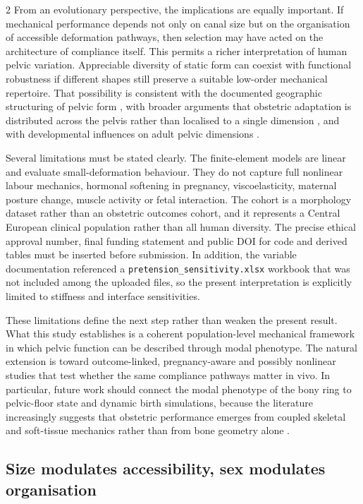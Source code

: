 \documentclass[openacc]{rsproca_new}
\begin{document}
\begin{multicols}{2}
From an evolutionary perspective, the implications are equally important. If mechanical performance depends not only on canal size but on the organisation of accessible deformation pathways, then selection may have acted on the architecture of compliance itself. This permits a richer interpretation of human pelvic variation. Appreciable diversity of static form can coexist with functional robustness if different shapes still preserve a suitable low-order mechanical repertoire. That possibility is consistent with the documented geographic structuring of pelvic form \cite{BettiManica2018,Auerbach2018}, with broader arguments that obstetric adaptation is distributed across the pelvis rather than localised to a single dimension \cite{KurkiDecrausaz2015}, and with developmental influences on adult pelvic dimensions \cite{VerbruggenNowlan2017,Novak2020}.

Several limitations must be stated clearly. The finite-element models are linear and evaluate small-deformation behaviour. They do not capture full nonlinear labour mechanics, hormonal softening in pregnancy, viscoelasticity, maternal posture change, muscle activity or fetal interaction. The cohort is a morphology dataset rather than an obstetric outcomes cohort, and it represents a Central European clinical population rather than all human diversity. The precise ethical approval number, final funding statement and public DOI for code and derived tables must be inserted before submission. In addition, the variable documentation referenced a \texttt{pretension\_sensitivity.xlsx} workbook that was not included among the uploaded files, so the present interpretation is explicitly limited to stiffness and interface sensitivities.

These limitations define the next step rather than weaken the present result. What this study establishes is a coherent population-level mechanical framework in which pelvic function can be described through modal phenotype. The natural extension is toward outcome-linked, pregnancy-aware and possibly nonlinear studies that test whether the same compliance pathways matter in vivo. In particular, future work should connect the modal phenotype of the bony ring to pelvic-floor state and dynamic birth simulations, because the literature increasingly suggests that obstetric performance emerges from coupled skeletal and soft-tissue mechanics rather than from bone geometry alone \cite{Pavlicev2020,Fremondiere2022}.


\subsection{Size modulates accessibility, sex modulates organisation}


\end{multicols}
\end{document}
